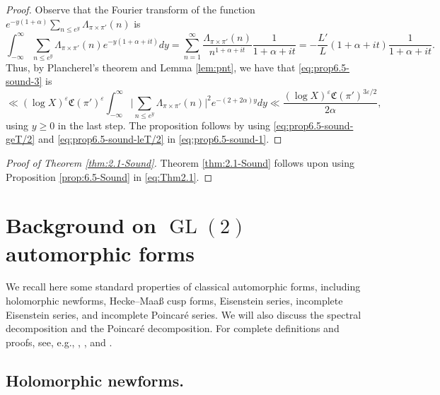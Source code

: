 \documentclass[12pt,reqno]{amsart}
\theoremstyle{remark}
\DeclareMathOperator{\GL}{GL}
\numberwithin{equation}{section}
\begin{document}
\begin{proof}
        
		Observe that the Fourier transform of the function $e^{-y(1+\alpha)} \sum_{n\le e^y} \Lambda_{\pi \times \pi'}(n)$ is 
		\begin{equation*}
			\int_{-\infty}^{\infty} \sum_{n \le e^y} \Lambda_{\pi\times\pi'} (n) e^{-y(1+\alpha+it)} dy = \sum_{n=1}^\infty \frac{\Lambda_{\pi\times \pi'}(n)}{n^{1+\alpha+it}}\frac{1}{1+\alpha+it} = -\frac{L'}{L}(1+\alpha+it) \frac{1}{1+\alpha+it}. 
		\end{equation*}
    Thus, by Plancherel's theorem and Lemma \ref{lem:pnt}, we have that \eqref{eq:prop6.5-sound-3} is 
		\begin{equation}
            \label{eq:prop6.5-sound-leT/2}
			\ll (\log X)^\varepsilon \mathfrak{C}(\pi')^{\varepsilon} \int_{-\infty}^{\infty}\Big|\sum_{n\le e^y}\Lambda_{\pi\times \pi'}(n)\Big|^2 e^{-(2+2\alpha)y} dy \ll \frac{(\log X)^\varepsilon \mathfrak{C}(\pi')^{3\varepsilon/2}} {2\alpha},
		\end{equation}
   using $y \ge 0$ in the last step. The proposition follows by using \eqref{eq:prop6.5-sound-geT/2} and \eqref{eq:prop6.5-sound-leT/2}  in \eqref{eq:prop6.5-sound-1}. 
  \end{proof}
        
        \begin{proof}[Proof of Theorem    \ref{thm:2.1-Sound}]
        Theorem \ref{thm:2.1-Sound} follows upon using Proposition \ref{prop:6.5-Sound} in \eqref{eq:Thm2.1}. 
        \end{proof}


	\section{Background on \texorpdfstring{$\GL(2)$}{GL(2)} automorphic forms}\label{sec:GL(2)}
     We recall here some standard properties of
    classical automorphic forms, including holomorphic newforms, Hecke--Maa{\ss} cusp forms, Eisenstein series, incomplete Eisenstein series, and incomplete Poincar\'e series. We will also discuss the spectral decomposition  and the Poincar\'e decomposition. For complete definitions and proofs, see, e.g., \cite{IK}, \cite{NPS}, and \cite{O}. 

	
	\subsection{Holomorphic newforms.}\label{subsec:newforms}
	
\end{document}
